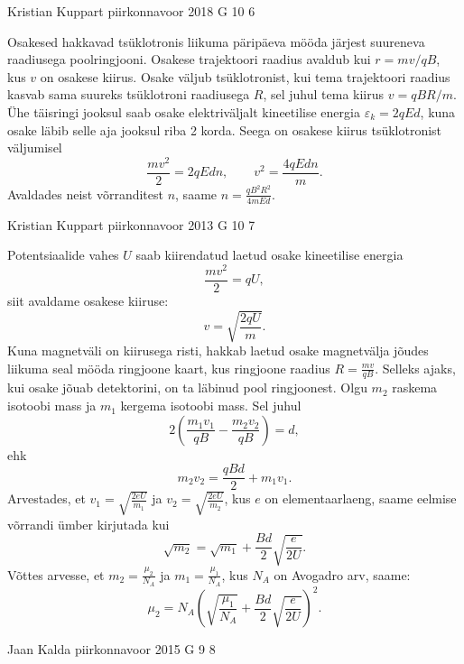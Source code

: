 \documentclass[11pt]{article}
\begin{document}
{%
{Kristian Kuppart} %
{piirkonnavoor} %
{2018} %
{G 10} %
{6} %
{

\ifSolution
Osakesed hakkavad tsüklotronis liikuma päripäeva mööda järjest suureneva raadiusega poolringjooni. Osakese trajektoori raadius avaldub kui $r=mv/qB$, kus $v$ on osakese kiirus. Osake väljub tsüklotronist, kui tema trajektoori raadius kasvab sama suureks tsüklotroni raadiusega $R$, sel juhul tema kiirus $v=qBR/m$. Ühe täisringi jooksul saab osake elektriväljalt kineetilise energia $\varepsilon_k=2qEd$, kuna osake läbib selle aja jooksul riba 2 korda. Seega on osakese kiirus tsüklotronist väljumisel
\[\frac{mv^2}{2}=2qEdn, \qquad v^2=\frac{4qEdn}{m}.\]
Avaldades neist võrranditest $n$, saame $\displaystyle n=\frac{qB^2R^2}{4mEd}$.
\fi
}

{Kristian Kuppart} %
{piirkonnavoor} %
{2013} %
{G 10} %
{7} %
{

\ifSolution
Potentsiaalide vahes $U$ saab kiirendatud laetud osake kineetilise
energia
\[
\frac{mv^{2}}{2}=qU,
\]
siit avaldame osakese kiiruse:
\[
v=\sqrt{\frac{2qU}{m}}.
\]
Kuna magnetväli on kiirusega risti, hakkab laetud osake 
magnetvälja jõudes liikuma seal mööda ringjoone kaart, kus ringjoone raadius
$R=\frac{mv}{qB}$. Selleks ajaks, kui osake jõuab detektorini,
on ta läbinud pool ringjoonest. Olgu $m_{2}$ raskema isotoobi
mass ja $m_{1}$ kergema isotoobi mass. Sel juhul 
\[ 
2\left(\frac{m_{1}v_{1}}{qB}-\frac{m_{2}v_{2}}{qB}\right)=d, 
\]
ehk
\[ 
m_{2}v_{2}=\frac{qBd}{2}+m_{1}v_{1 }.
\]
Arvestades, et $v_{1}=\sqrt{\frac{2eU}{m_{1}}}$ ja $v_{2}=\sqrt{\frac{2eU}{m_{2}}}$,
kus $e$ on elementaarlaeng, saame eelmise võrrandi ümber kirjutada kui
\[ \sqrt{m_{2}}=\sqrt{m_{1}}+\frac{Bd}{2}\sqrt{\frac{e}{2U}}. \]
Võttes arvesse, et $m_{2}=\frac{\mu_{2}}{N_{A}}$ ja $m_{1}=\frac{\mu_{1}}{N_{A}}$,
kus $N_{A}$ on Avogadro arv, saame:
\[ \mu_{2}=N_{A}\left(\sqrt{\frac{\mu_{1}}{N_{A}}}+\frac{Bd}{2}\sqrt{\frac{e}{2U}}\right)^{2}.\]
\fi
}

{Jaan Kalda} %
{piirkonnavoor} %
{2015} %
{G 9} %
{8} %
{

}}
\end{document}
